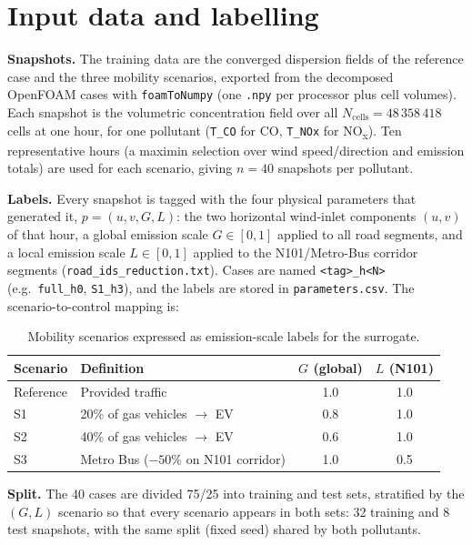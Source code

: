 \documentclass[11pt]{article}
\begin{document}
\section{Input data and labelling}
\textbf{Snapshots.} The training data are the converged dispersion fields of the reference case
and the three mobility scenarios, exported from the decomposed OpenFOAM cases with
\texttt{foamToNumpy} (one \texttt{.npy} per processor plus cell volumes). Each snapshot is the
volumetric concentration field over all $N_{\text{cells}}=48\,358\,418$ cells at one hour, for one
pollutant (\texttt{T\_CO} for CO, \texttt{T\_NOx} for NO\textsubscript{x}). Ten representative
hours (a maximin selection over wind speed/direction and emission totals) are used for each
scenario, giving $n=40$ snapshots per pollutant.

\textbf{Labels.} Every snapshot is tagged with the four physical parameters that generated it,
$p=(u,v,G,L)$: the two horizontal wind-inlet components $(u,v)$ of that hour, a global emission
scale $G\in[0,1]$ applied to all road segments, and a local emission scale $L\in[0,1]$ applied to
the N101/Metro-Bus corridor segments (\texttt{road\_ids\_reduction.txt}). Cases are named
\texttt{<tag>\_h<N>} (e.g.\ \texttt{full\_h0}, \texttt{S1\_h3}), and the labels are stored in
\texttt{parameters.csv}. The scenario-to-control mapping is:

\begin{table}[h]
\centering
\begin{tabular}{@{}llcc@{}}
\toprule
Scenario & Definition & $G$ (global) & $L$ (N101) \\
\midrule
Reference        & Provided traffic                         & 1.0 & 1.0 \\
S1               & 20\% of gas vehicles $\rightarrow$ EV    & 0.8 & 1.0 \\
S2               & 40\% of gas vehicles $\rightarrow$ EV    & 0.6 & 1.0 \\
S3               & Metro Bus ($-50\%$ on N101 corridor)     & 1.0 & 0.5 \\
\bottomrule
\end{tabular}
\caption{Mobility scenarios expressed as emission-scale labels for the surrogate.}
\end{table}

\textbf{Split.} The 40 cases are divided 75/25 into training and test sets, stratified by the
$(G,L)$ scenario so that every scenario appears in both sets: 32 training and 8 test snapshots,
with the same split (fixed seed) shared by both pollutants.
\end{document}
